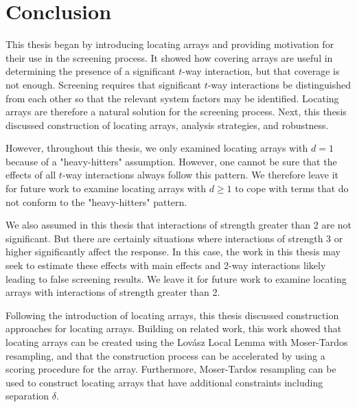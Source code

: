 \chapter{Conclusion} \label{chptr:conclusion}

This thesis began by introducing locating arrays and providing motivation for their use in the screening process.
It showed how covering arrays are useful in determining the presence of a significant $t$-way interaction, but that coverage is not enough.
Screening requires that significant $t$-way interactions be distinguished from each other so that the relevant system factors may be identified.
Locating arrays are therefore a natural solution for the screening process.
Next, this thesis discussed construction of locating arrays, analysis strategies, and robustness.

However, throughout this thesis, we only examined locating arrays with $d = 1$ because of a "heavy-hitters" assumption.
However, one cannot be sure that the effects of all $t$-way interactions always follow this pattern.
We therefore leave it for  future work to examine locating arrays with $d \geq 1$ to cope with terms that do not conform to the "heavy-hitters" pattern.

We also assumed in this thesis that interactions of strength greater than 2 are not significant.
But there are certainly situations where interactions of strength 3 or higher significantly affect the response.
In this case, the work in this thesis may seek to estimate these effects with main effects and 2-way interactions likely leading to false screening results.
We leave it for future work to examine locating arrays with interactions of strength greater than 2.

Following the introduction of locating arrays, this thesis discussed construction approaches for locating arrays.
Building on related work, this work showed that locating arrays can be created using the Lov{\'a}sz Local Lemma with Moser-Tardos resampling, and that the construction process can be accelerated by using a scoring procedure for the array.
Furthermore, Moser-Tardos resampling can be used to construct locating arrays that have additional constraints including separation $\delta$.

